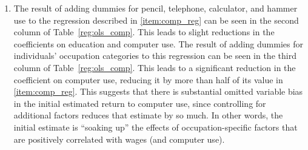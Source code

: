 \documentclass{article}
\begin{document}
\begin{enumerate}
\begin{enumerate}
\item The result of adding dummies for pencil, telephone, calculator, and hammer use to the regression described in \ref{item:comp_reg} can be seen in the second column of Table~\ref{reg:ols_comp}. This leads to slight reductions in the coefficients on education and computer use. The result of adding dummies for individuals' occupation categories to this regression can be seen in the third column of Table~\ref{reg:ols_comp}. This leads to a significant reduction in the coefficient on computer use, reducing it by more than half of its value in \ref{item:comp_reg}. This suggests that there is substantial omitted variable bias in the initial estimated return to computer use, since controlling for additional factors reduces that estimate by so much. In other words, the initial estimate is ``soaking up'' the effects of occupation-specific factors that are positively correlated with wages (and computer use).

\end{enumerate}
\end{enumerate}






\end{document}
